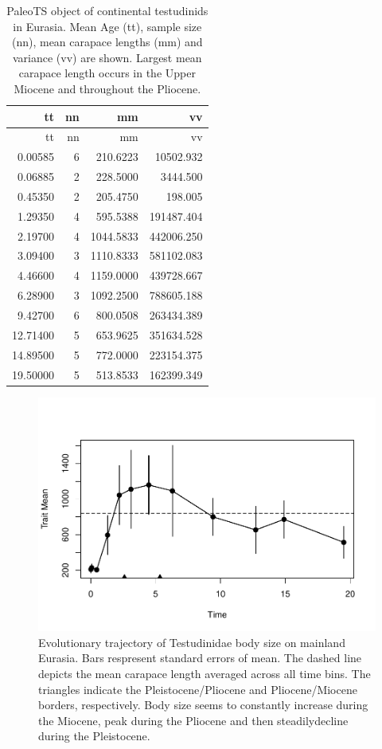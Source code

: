 \begin{longtable}[]{@{}rrrr@{}}
	\caption[PaleoTS object of continental \T in Eurasia]{PaleoTS object of continental testudinids in Eurasia. Mean Age (tt), sample size (nn), mean carapace lengths (mm) and variance (vv) are shown. Largest mean carapace length occurs in the Upper Miocene and throughout the Pliocene.}
	\tabularnewline
	\toprule
	tt & nn & mm & vv\tabularnewline
	\midrule
	\endfirsthead
	\toprule
	tt & nn & mm & vv\tabularnewline
	\midrule
	\endhead
	0.00585 & 6 & 210.6223 & 10502.932\tabularnewline
	0.06885 & 2 & 228.5000 & 3444.500\tabularnewline
	0.45350 & 2 & 205.4750 & 198.005\tabularnewline
	1.29350 & 4 & 595.5388 & 191487.404\tabularnewline
	2.19700 & 4 & 1044.5833 & 442006.250\tabularnewline
	3.09400 & 3 & 1110.8333 & 581102.083\tabularnewline
	4.46600 & 4 & 1159.0000 & 439728.667\tabularnewline
	6.28900 & 3 & 1092.2500 & 788605.188\tabularnewline
	9.42700 & 6 & 800.0508 & 263434.389\tabularnewline
	12.71400 & 5 & 653.9625 & 351634.528\tabularnewline
	14.89500 & 5 & 772.0000 & 223154.375\tabularnewline
	19.50000 & 5 & 513.8533 & 162399.349\tabularnewline
	\bottomrule
\end{longtable}

\begin{figure}[H]
	\centering
	\includegraphics{MA_JJ_files/figure-latex/pTSEsC-1.pdf}
	\caption[PaleoTS plot of continental \T in Eurasia]{Evolutionary trajectory of Testudinidae body size on mainland Eurasia. Bars respresent standard errors of mean. The dashed line depicts the mean carapace length averaged across all time bins. The triangles indicate the Pleistocene/Pliocene and Pliocene/Miocene borders, respectively. Body size seems to constantly increase during the Miocene, peak during the Pliocene and then steadilydecline during the Pleistocene.}
	\label{fig:pTSEsC}
\end{figure}

